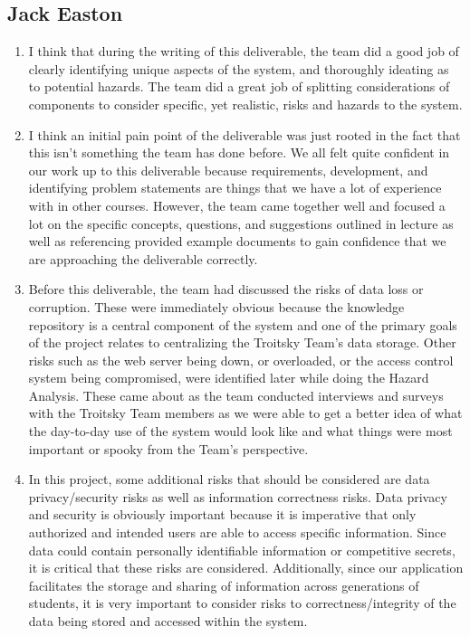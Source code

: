 \documentclass{article}
\begin{document}
\subsection*{Jack Easton}

\begin{enumerate}
    \item I think that during the writing of this deliverable, the team did a good job of clearly identifying unique aspects of the system, and thoroughly ideating as to potential hazards. The team did a great job of splitting considerations of components to consider specific, yet realistic, risks and hazards to the system.
    \item I think an initial pain point of the deliverable was just rooted in the fact that this isn't something the team has done before. We all felt quite confident in our work up to this deliverable because requirements, development, and identifying problem statements are things that we have a lot of experience with in other courses. However, the team came together well and focused a lot on the specific concepts, questions, and suggestions outlined in lecture as well as referencing provided example documents to gain confidence that we are approaching the deliverable correctly.
    \item Before this deliverable, the team had discussed the risks of data loss or corruption. These were immediately obvious because the knowledge repository is a central component of the system and one of the primary goals of the project relates to centralizing the Troitsky Team's data storage. Other risks such as the web server being down, or overloaded, or the access control system being compromised, were identified later while doing the Hazard Analysis. These came about as the team conducted interviews and surveys with the Troitsky Team members as we were able to get a better idea of what the day-to-day use of the system would look like and what things were most important or spooky from the Team's perspective.
    \item In this project, some additional risks that should be considered are data privacy/security risks as well as information correctness risks. Data privacy and security is obviously important because it is imperative that only authorized and intended users are able to access specific information. Since data could contain personally identifiable information or competitive secrets, it is critical that these risks are considered. Additionally, since our application facilitates the storage and sharing of information across generations of students, it is very important to consider risks to correctness/integrity of the data being stored and accessed within the system.
\end{enumerate}
\end{document}
